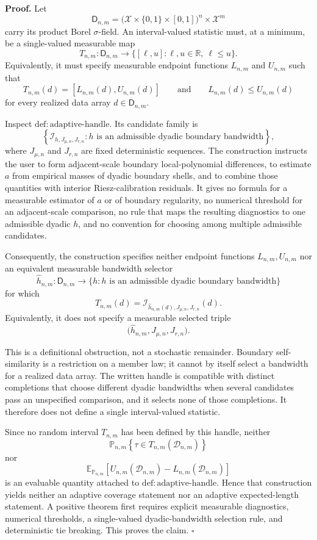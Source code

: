 \textbf{Proof.}
Let
\[
\mathsf D_{n,m}
=\bigl(\mathcal X\times\{0,1\}\times[0,1]\bigr)^n\times\mathcal X^m
\]
carry its product Borel \(\sigma\)-field.  An interval-valued statistic must, at a minimum, be a single-valued measurable map
\[
T_{n,m}:\mathsf D_{n,m}\longrightarrow
\bigl\{[\ell,u]:\ell,u\in\mathbb R,\ \ell\le u\bigr\}.
\]
Equivalently, it must specify measurable endpoint functions \(L_{n,m}\) and \(U_{n,m}\) such that
\[
T_{n,m}(d)=[L_{n,m}(d),U_{n,m}(d)]
\qquad\text{and}\qquad
L_{n,m}(d)\le U_{n,m}(d)
\]
for every realized data array \(d\in\mathsf D_{n,m}\).

Inspect \(\mathrm{def:adaptive\text{-}handle}\).  Its candidate family is
\[
\left\{\mathcal I_{h,J_{\mu,n},J_{r,n}}:
h\text{ is an admissible dyadic boundary bandwidth}\right\},
\]
where \(J_{\mu,n}\) and \(J_{r,n}\) are fixed deterministic sequences.  The construction instructs the user to form adjacent-scale boundary local-polynomial differences, to estimate \(a\) from empirical masses of dyadic boundary shells, and to combine those quantities with interior Riesz-calibration residuals.  It gives no formula for a measurable estimator of \(a\) or of boundary regularity, no numerical threshold for an adjacent-scale comparison, no rule that maps the resulting diagnostics to one admissible dyadic \(h\), and no convention for choosing among multiple admissible candidates.

Consequently, the construction specifies neither endpoint functions \(L_{n,m},U_{n,m}\) nor an equivalent measurable bandwidth selector
\[
\widehat h_{n,m}:\mathsf D_{n,m}\longrightarrow
\{h:h\text{ is an admissible dyadic boundary bandwidth}\}
\]
for which
\[
T_{n,m}(d)
=\mathcal I_{\widehat h_{n,m}(d),J_{\mu,n},J_{r,n}}(d).
\]
Equivalently, it does not specify a measurable selected triple
\[
\bigl(\widehat h_{n,m},J_{\mu,n},J_{r,n}\bigr).
\]

This is a definitional obstruction, not a stochastic remainder.  Boundary self-similarity is a restriction on a member law; it cannot by itself select a bandwidth for a realized data array.  The written handle is compatible with distinct completions that choose different dyadic bandwidths when several candidates pass an unspecified comparison, and it selects none of those completions.  It therefore does not define a single interval-valued statistic.

Since no random interval \(T_{n,m}\) has been defined by this handle, neither
\[
\mathbb P_{n,m}\!\left\{\tau\in T_{n,m}(\mathcal D_{n,m})\right\}
\]
nor
\[
\mathbb E_{\mathbb P_{n,m}}\!\left[
U_{n,m}(\mathcal D_{n,m})-L_{n,m}(\mathcal D_{n,m})
\right]
\]
is an evaluable quantity attached to \(\mathrm{def:adaptive\text{-}handle}\).  Hence that construction yields neither an adaptive coverage statement nor an adaptive expected-length statement.  A positive theorem first requires explicit measurable diagnostics, numerical thresholds, a single-valued dyadic-bandwidth selection rule, and deterministic tie breaking.  This proves the claim. \(\square\)